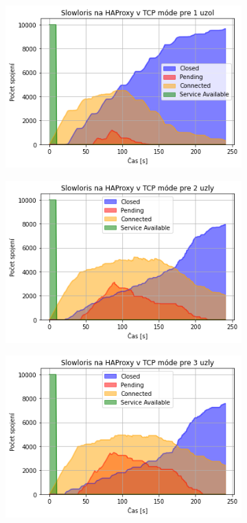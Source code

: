 \documentclass[12pt, a4paper]{article}
\begin{document}
\begin{figure}[h!]
	\centering
	\begin{subfigure}[t]{.32\textwidth}
  		\centering
  		\includegraphics[width=\textwidth]{images/haproxy-1-tcp.png}
	\end{subfigure}
	\begin{subfigure}[t]{.32\textwidth}
  		\centering
  		\includegraphics[width=\textwidth]{images/haproxy-2-tcp.png}
	\end{subfigure}
	\begin{subfigure}[t]{.32\textwidth}
  		\centering
  		\includegraphics[width=\textwidth]{images/haproxy-3-tcp.png}

\end{subfigure}
\end{figure}
\end{document}
